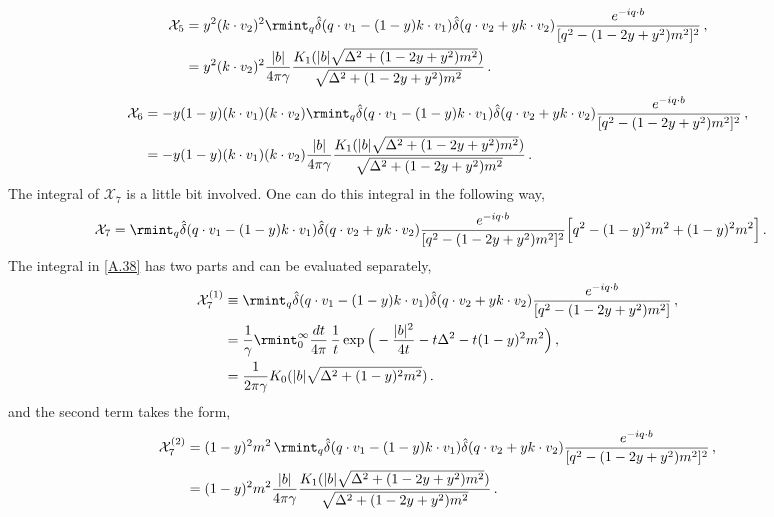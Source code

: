 \begin{align}
    \begin{split}
         \mathcal{X}_5&=y^2 (k\cdot v_2)^2\rmint_q \hat\delta(q\cdot v_1-(1-y)k\cdot v_1)\hat\delta(q\cdot v_2+yk\cdot v_2)\frac{e^{-i q\cdot b}}{[q^2-(1-2y+y^2)m^2]^2}\,,\\ &
        =y^2 (k\cdot v_2)^2\frac{|b|}{4\pi \gamma}\frac{K_1( |b|\sqrt{\Delta^2+(1-2y+y^2)m^2})}{\sqrt{\Delta^2+(1-2y+y^2)m^2}}\,.
    \end{split}
\end{align}
\begin{align}
    \begin{split}
        \mathcal{X}_{6}&=-y(1-y)(k\cdot v_1)(k\cdot v_2)\rmint_q \hat\delta(q\cdot v_1-(1-y)k\cdot v_1)\hat\delta(q\cdot v_2+yk\cdot v_2)\frac{e^{-i q\cdot b}}{[q^2-(1-2y+y^2)m^2]^2}\,,\\ &
        =-y(1-y)(k\cdot v_1)(k\cdot v_2)\frac{|b|}{4\pi \gamma}\frac{K_1( |b|\sqrt{\Delta^2+(1-2y+y^2)m^2})}{\sqrt{\Delta^2+(1-2y+y^2)m^2}}\,.
    \end{split}
\end{align}
The integral of $\mathcal{X}_7$ is a little bit involved. One can do this integral in the following way,
\begin{align}
    \begin{split}
        \mathcal{X}_7&=\rmint_q \hat\delta(q\cdot v_1-(1-y)k\cdot v_1)\hat\delta(q\cdot v_2+yk\cdot v_2)\frac{e^{-i q\cdot b}}{[q^2-(1-2y+y^2)m^2]^2}\Big[q^2-(1-y)^2m^2+(1-y)^2 m^2\Big]\,.\label{A.38}
    \end{split}
\end{align}
The integral in \eqref{A.38} has two parts and can be evaluated separately,
\begin{align}
    \begin{split}
        \mathcal{X}_7^{(1)}&\equiv  \rmint_q \hat\delta(q\cdot v_1-(1-y)k\cdot v_1)\hat\delta(q\cdot v_2+yk\cdot v_2)\frac{e^{-i q\cdot b}}{[q^2-(1-2y+y^2)m^2]}\,,\\ &
        =\frac{1}{\gamma}\rmint_0^\infty \frac{dt}{4\pi}\,\frac{1}{t}\exp\Big(-\frac{|b|^2}{4t}-t\Delta^2-t(1-y)^2m^2\Big)\,,\\ &
        =\frac{1}{2\pi \gamma}K_{0}(|b|\sqrt{\Delta^2+(1-y)^2m^2})\,.
    \end{split}
\end{align}
and the second term takes the form,
\begin{align}
    \begin{split}
        \mathcal{X}_7^{(2)}&=(1-y)^2 m^2\,\rmint_q \hat\delta(q\cdot v_1-(1-y)k\cdot v_1)\hat\delta(q\cdot v_2+yk\cdot v_2)\frac{e^{-i q\cdot b}}{[q^2-(1-2y+y^2)m^2]^2}\,,\\ &
        =(1-y)^2 m^2\frac{|b|}{4\pi\gamma} \frac{K_1( |b|\sqrt{\Delta^2+(1-2y+y^2)m^2})}{\sqrt{\Delta^2+(1-2y+y^2)m^2}}\,.
    \end{split}
\end{align}



